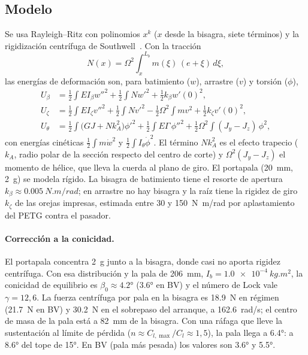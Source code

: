 \subsection{Modelo}
Se usa Rayleigh--Ritz con polinomios $x^k$ ($x$ desde la bisagra, siete términos) y la
rigidización centrífuga de Southwell~\cite{johnson1980,johnson2013}. Con la tracción
\begin{equation}
  N(x)=\Omega^2\int_x^{L_b} m(\xi)\,(e+\xi)\,d\xi ,
  \label{eq:estructura-N}
\end{equation}
las energías de deformación son, para batimiento ($w$), arrastre ($v$) y torsión ($\phi$),
\begin{align}
  U_\beta &= \tfrac12\!\int EI_\beta w''^2 + \tfrac12\!\int N w'^2 + \tfrac12 k_\beta w'(0)^2,\nonumber\\
  U_\zeta &= \tfrac12\!\int EI_\zeta v''^2 + \tfrac12\!\int N v'^2 - \tfrac12\Omega^2\!\int m v^2 + \tfrac12 k_\zeta v'(0)^2,
  \label{eq:estructura-ritz}\\
  U_\theta &= \tfrac12\!\int \bigl(GJ + N k_A^2\bigr)\phi'^2 + \tfrac12\!\int E\Gamma\,\phi''^2
     + \tfrac12\Omega^2\!\int (J_y-J_z)\,\phi^2 ,\nonumber
\end{align}
con energías cinéticas $\frac12\int m\dot w^2$ y $\frac12\int I_\theta\dot\phi^2$. El
término $Nk_A^2$ es el efecto trapecio ($k_A$, radio polar de la sección respecto del
centro de corte) y $\Omega^2(J_y-J_z)$ el momento de hélice, que lleva la cuerda al plano
de giro. El portapala (\SI{20}{mm}, \SI{2}{g}) se modela rígido. La bisagra de
batimiento tiene el resorte de apertura $k_\beta\approx\SI{0.005}{N.m/rad}$; en arrastre
no hay bisagra y la raíz tiene la rigidez de giro $k_\zeta$ de las orejas impresas,
estimada entre 30 y \SI{150}{N.m/rad} por aplastamiento del PETG contra el pasador.

\paragraph{Corrección a la conicidad.} El portapala concentra \SI{2}{g} junto a la
bisagra, donde casi no aporta rigidez centrífuga. Con esa distribución y la pala de
\SI{206}{mm}, $I_b=\SI{1.0e-4}{kg.m^2}$, la conicidad de equilibrio es
$\beta_0\approx\ang{4.2}$ (\ang{3.6} en BV) y el número de Lock vale $\gamma=12{,}6$. La
fuerza centrífuga por pala en la bisagra es \SI{18.9}{N} en régimen (\SI{21.7}{N} en BV) y
\SI{30.2}{N} en el sobrepaso del arranque, a \SI{162.6}{rad/s}; el centro de masa de la pala
está a \SI{82}{mm} de la bisagra. Con una ráfaga que lleve la sustentación al límite de
pérdida ($n\approx C_{l,\max}/C_l\approx1{,}5$), la pala llega a \ang{6.4}: a \ang{8.6} del tope
de \ang{+15}. En BV (pala más pesada) los valores son \ang{3.6} y \ang{5.5}.

